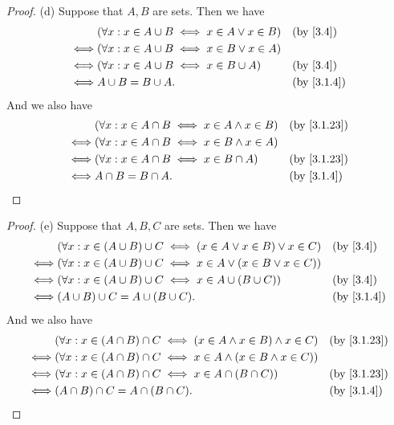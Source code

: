 \begin{proof}{(d)}
  Suppose that \(A, B\) are sets.
  Then we have
  \begin{align*}
         & (\forall x : x \in A \cup B \iff x \in A \lor x \in B) &  & \by{3.4}   \\
    \iff & (\forall x : x \in A \cup B \iff x \in B \lor x \in A)                 \\
    \iff & (\forall x : x \in A \cup B \iff x \in B \cup A)       &  & \by{3.4}   \\
    \iff & A \cup B = B \cup A.                                   &  & \by{3.1.4}
  \end{align*}
  And we also have
  \begin{align*}
         & (\forall x : x \in A \cap B \iff x \in A \land x \in B) &  & \by{3.1.23} \\
    \iff & (\forall x : x \in A \cap B \iff x \in B \land x \in A)                  \\
    \iff & (\forall x : x \in A \cap B \iff x \in B \cap A)        &  & \by{3.1.23} \\
    \iff & A \cap B = B \cap A.                                    &  & \by{3.1.4}
  \end{align*}
\end{proof}

\begin{proof}{(e)}
  Suppose that \(A, B, C\) are sets.
  Then we have
  \begin{align*}
         & (\forall x : x \in (A \cup B) \cup C \iff (x \in A \lor x \in B) \lor x \in C) &  & \by{3.4}   \\
    \iff & (\forall x : x \in (A \cup B) \cup C \iff x \in A \lor (x \in B \lor x \in C))                 \\
    \iff & (\forall x : x \in (A \cup B) \cup C \iff x \in A \cup (B \cup C))             &  & \by{3.4}   \\
    \iff & (A \cup B) \cup C = A \cup (B \cup C).                                         &  & \by{3.1.4}
  \end{align*}
  And we also have
  \begin{align*}
         & (\forall x : x \in (A \cap B) \cap C \iff (x \in A \land x \in B) \land x \in C) &  & \by{3.1.23} \\
    \iff & (\forall x : x \in (A \cap B) \cap C \iff x \in A \land (x \in B \land x \in C))                  \\
    \iff & (\forall x : x \in (A \cap B) \cap C \iff x \in A \cap (B \cap C))               &  & \by{3.1.23} \\
    \iff & (A \cap B) \cap C = A \cap (B \cap C).                                           &  & \by{3.1.4}
  \end{align*}
\end{proof}

